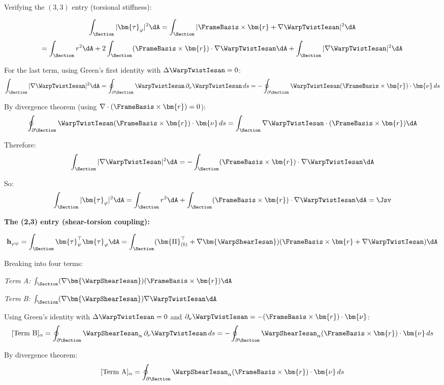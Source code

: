 \begin{Details}
Verifying the \((3,3)\) entry (torsional stiffness):

\[
\int_\Section |\bm{\tau}_\varphi|^2 \dA = \int_\Section |\FrameBasis \times \bm{r} + \nabla\WarpTwistIesan|^2 \dA
\]
\[= \int_\Section r^2 \dA + 2\int_\Section (\FrameBasis \times \bm{r}) \cdot \nabla\WarpTwistIesan \dA + \int_\Section |\nabla\WarpTwistIesan|^2 \dA
\]

For the last term, using Green's first identity with
\(\Delta\WarpTwistIesan = 0\):
\[\int_\Section |\nabla\WarpTwistIesan|^2 \dA = \oint_{\partial\Section} \WarpTwistIesan \,\partial_\nu\WarpTwistIesan \, ds = -\oint_{\partial\Section} \WarpTwistIesan (\FrameBasis \times \bm{r}) \cdot \bm{\nu} \, ds\]

By divergence theorem (using
\(\nabla \cdot (\FrameBasis \times \bm{r}) = 0\)):
\[\oint_{\partial\Section} \WarpTwistIesan (\FrameBasis \times \bm{r}) \cdot \bm{\nu} \, ds = \int_\Section \nabla\WarpTwistIesan \cdot (\FrameBasis \times \bm{r}) \dA\]

Therefore:
\[\int_\Section |\nabla\WarpTwistIesan|^2 \dA = -\int_\Section (\FrameBasis \times \bm{r}) \cdot \nabla\WarpTwistIesan \dA\]

So:
\[\int_\Section |\bm{\tau}_\varphi|^2 \dA = \int_\Section r^2 \dA + \int_\Section (\FrameBasis \times \bm{r}) \cdot \nabla\WarpTwistIesan \dA = \Jsv\]

\textbf{The (2,3) entry (shear-torsion coupling):}

\[\mathbf{h}_{\varphi\psi} = \int_\Section \bm{\tau}_\psi^\top \bm{\tau}_\varphi \dA = \int_\Section (\bm{\Pi}_{(b)}^\top + \nabla\bm{\WarpShearIesan})(\FrameBasis \times \bm{r} + \nabla\WarpTwistIesan) \dA\]

Breaking into four terms:

\emph{Term A:}
\(\int_\Section (\nabla\bm{\WarpShearIesan})(\FrameBasis \times \bm{r}) \dA\)

\emph{Term B:}
\(\int_\Section (\nabla\bm{\WarpShearIesan})\nabla\WarpTwistIesan \dA\)

Using Green's identity with \(\Delta\WarpTwistIesan = 0\) and
\(\partial_\nu\WarpTwistIesan = -(\FrameBasis \times \bm{r}) \cdot \bm{\nu}\):
\[[\text{Term B}]_\alpha = \oint_{\partial\Section} \WarpShearIesan_\alpha \,\partial_\nu\WarpTwistIesan \, ds = -\oint_{\partial\Section} \WarpShearIesan_\alpha (\FrameBasis \times \bm{r}) \cdot \bm{\nu} \, ds\]

By divergence theorem:
\[[\text{Term A}]_\alpha = \oint_{\partial\Section} \WarpShearIesan_\alpha (\FrameBasis \times \bm{r}) \cdot \bm{\nu} \, ds\]


\end{Details}
